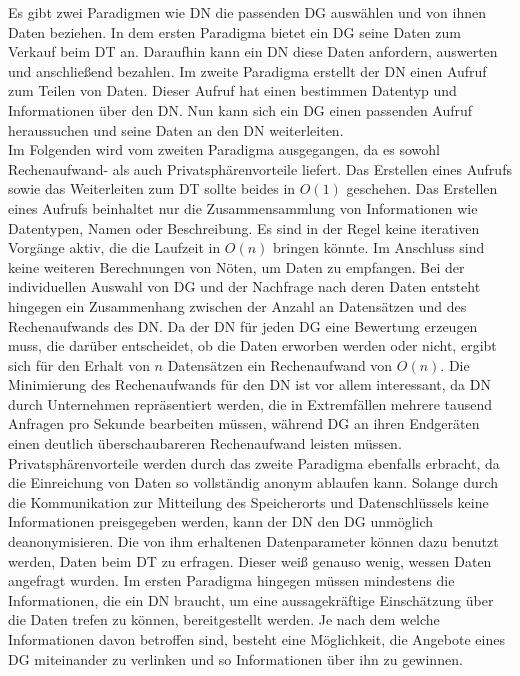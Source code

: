 \documentclass[
	fontsize=11pt,
	headings=small,
	parskip=half,           %
	bibliography=totoc,
	numbers=noenddot,       %
	open=any,               %
]{scrreprt}
\begin{document}
Es gibt zwei Paradigmen wie DN die passenden DG auswählen und von ihnen Daten beziehen. In dem ersten Paradigma bietet ein DG seine Daten zum Verkauf beim DT an. Daraufhin kann ein DN diese Daten anfordern, auswerten und anschließend bezahlen. Im zweite Paradigma erstellt der DN einen Aufruf zum Teilen von Daten. Dieser Aufruf hat einen bestimmen Datentyp und Informationen über den DN. Nun kann sich ein DG einen passenden Aufruf heraussuchen und seine Daten an den DN weiterleiten. \\
Im Folgenden wird vom zweiten Paradigma ausgegangen, da es sowohl Rechenaufwand- als auch Privatsphärenvorteile liefert. Das Erstellen eines Aufrufs sowie das Weiterleiten zum DT sollte beides in $O(1)$ geschehen. Das Erstellen eines Aufrufs beinhaltet nur die Zusammensammlung von Informationen wie Datentypen, Namen oder Beschreibung. Es sind in der Regel keine iterativen Vorgänge aktiv, die die Laufzeit in $O(n)$ bringen könnte. Im Anschluss sind keine weiteren Berechnungen von Nöten, um Daten zu empfangen. Bei der individuellen Auswahl von DG und der Nachfrage nach deren Daten entsteht hingegen ein Zusammenhang zwischen der Anzahl an Datensätzen und des Rechenaufwands des DN. Da der DN für jeden DG eine Bewertung erzeugen muss, die darüber entscheidet, ob die Daten erworben werden oder nicht, ergibt sich für den Erhalt von $n$ Datensätzen ein Rechenaufwand von $O(n)$. Die Minimierung des Rechenaufwands für den DN ist vor allem interessant, da DN durch Unternehmen repräsentiert werden, die in Extremfällen mehrere tausend Anfragen pro Sekunde bearbeiten müssen, während DG an ihren Endgeräten einen deutlich überschaubareren Rechenaufwand leisten müssen. \\
Privatsphärenvorteile werden durch das zweite Paradigma ebenfalls erbracht, da die Einreichung von Daten so vollständig anonym ablaufen kann. Solange durch die Kommunikation zur Mitteilung des Speicherorts und Datenschlüssels keine Informationen preisgegeben werden, kann der DN den DG unmöglich deanonymisieren. Die von ihm erhaltenen Datenparameter können dazu benutzt werden, Daten beim DT zu erfragen. Dieser weiß genauso wenig, wessen Daten angefragt wurden. Im ersten Paradigma hingegen müssen mindestens die Informationen, die ein DN braucht, um eine aussagekräftige Einschätzung über die Daten trefen zu können, bereitgestellt werden. Je nach dem welche Informationen davon betroffen sind, besteht eine Möglichkeit, die Angebote eines DG miteinander zu verlinken und so Informationen über ihn zu gewinnen.

 
\end{document}
